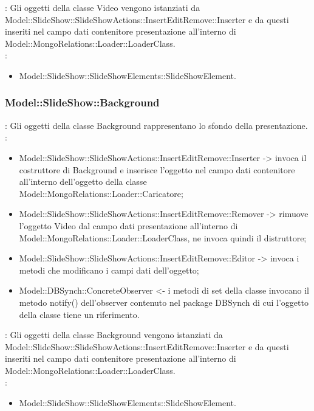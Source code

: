 {{\begin{itemize}
				\end{itemize}	
                \textbf{\interfacce}: Gli oggetti della classe Video vengono istanziati da Model::SlideShow::SlideShowActions::InsertEditRemove::Inserter e da questi inseriti nel campo dati contenitore presentazione all’interno di \\Model::MongoRelations::Loader::LoaderClass.\\
                \textbf{\base}: 
                    \begin{itemize}
                    \item Model::SlideShow::SlideShowElements::SlideShowElement.
                    \end{itemize}
                    }     
                 \subsubsection{Model::SlideShow::Background}{
                				\textbf{\tipo}: Gli oggetti della classe Background rappresentano lo sfondo della presentazione.\\
                				\textbf{\relaz}: 
                				\begin{itemize}
                					\item Model::SlideShow::SlideShowActions::InsertEditRemove::Inserter -> invoca il costruttore di Background e inserisce l’oggetto nel campo dati contenitore all’interno dell’oggetto della classe Model::MongoRelations::Loader::Caricatore;
                                    \item Model::SlideShow::SlideShowActions::InsertEditRemove::Remover -> rimuove l’oggetto Video dal campo dati presentazione all’interno di Model::MongoRelations::Loader::LoaderClass, ne invoca quindi il distruttore;
                                    \item Model::SlideShow::SlideShowActions::InsertEditRemove::Editor -> invoca i metodi che modificano i campi dati dell'oggetto;
                    \item Model::DBSynch::ConcreteObserver <- i metodi di set della classe invocano il metodo notify() dell'observer contenuto nel package DBSynch di cui l'oggetto della classe tiene un riferimento.
                				\end{itemize}	
                                \textbf{\interfacce}: Gli oggetti della classe Background vengono istanziati da Model::SlideShow::SlideShowActions::InsertEditRemove::Inserter e da questi inseriti nel campo dati contenitore presentazione all’interno di\\ Model::MongoRelations::Loader::LoaderClass.\\
                                \textbf{\base}: 
                                    \begin{itemize}
                                    \item Model::SlideShow::SlideShowElements::SlideShowElement.
                                    \end{itemize}
                                    }              
}

